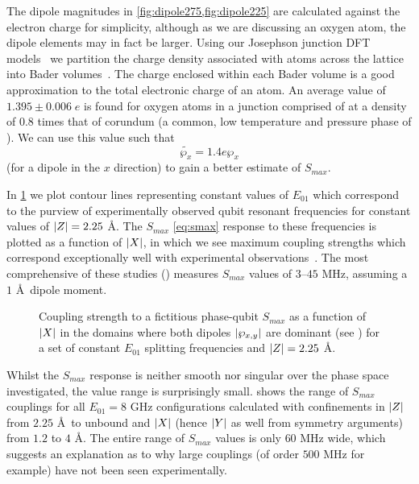 The dipole magnitudes in \cref{fig:dipole275,fig:dipole225} are calculated against the electron charge for simplicity, although as we are discussing an oxygen atom, the dipole elements may in fact be larger.
Using our Josephson junction DFT models~\cite{DuBois2013} we partition the charge density associated with atoms across the lattice into Bader volumes~\cite{Tang2009}.
The charge enclosed within each Bader volume is a good approximation to the total electronic charge of an atom.
An average value of $1.395\pm0.006 \; e$ is found for oxygen atoms in a junction comprised of  at a density of 0.8 times that of corundum (a common, low temperature and pressure phase of ). We can use this value such that
\begin{equation}
\widetilde{\wp_x} = 1.4e\wp_x
\end{equation}
(for a dipole in the $x$ direction) to gain a better estimate of $S_{max}$.

In \cref{fig:smax225} we plot contour lines representing constant values of $E_{01}$ which correspond to the purview of experimentally observed qubit resonant frequencies for constant values of $\lvert Z\rvert = 2.25$ \AA.
The $S_{max}$ \cref{eq:smax} response to these frequencies is plotted as a function of $\lvert X\rvert$, in which we see maximum coupling strengths which correspond exceptionally well with experimental observations~\cite{Lupascu2009, Shalibo2010, Cole2010}.
The most comprehensive of these studies () measures $S_{max}$ values of $3$--$45$ MHz, assuming a $1$ \AA\ dipole moment.

\begin{figure}[htp]
\resizebox{0.9\textwidth}{!}{}
\caption[$S_{max}$ couplings]{\label{fig:smax225}Coupling strength to a fictitious phase-qubit $S_{max}$ as a function of $\lvert X\rvert$ in the domains where both dipoles $\lvert\wp_{x,y}\rvert$ are dominant (see ) for a set of constant $E_{01}$ splitting frequencies and $\lvert Z\rvert = 2.25$ \AA.}
\end{figure}

Whilst the $S_{max}$ response is neither smooth nor singular over the phase space investigated, the value range is surprisingly small.
 shows the range of $S_{max}$ couplings for all $E_{01}=8$ GHz configurations calculated with confinements in $\lvert Z\rvert$ from $2.25$ \AA\ to unbound and $\lvert X\rvert$ (hence $\lvert Y\rvert$ as well from symmetry arguments) from $1.2$ to $4$ \AA.
The entire range of $S_{max}$ values is only $60$ MHz wide, which suggests an explanation as to why large couplings (of order $500$ MHz for example) have not been seen experimentally.

